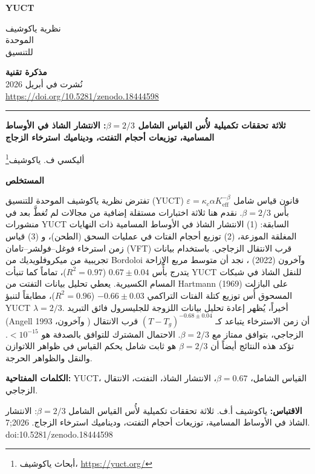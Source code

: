 \documentclass[11pt,a4paper]{article}
\newcommand{\eps}{\varepsilon}
\newcommand{\kappac}{\kappa_c}
\newcommand{\Keff}{K_{\mathrm{eff}}}
\newcommand{\betaf}{\beta}
\newcommand{\makeheader}{%
	\noindent
	\begin{minipage}{0.17\textwidth}
		\raggedright
		{\sffamily\bfseries\color{skyblue}\fontsize{46}{46}\selectfont YUCT}%
	\end{minipage}%
	\hspace{30pt}
	\begin{minipage}{0.32\textwidth}
		\raggedright
		{\sffamily\fontsize{11}{13}\selectfont نظرية ياكوشيف\\ الموحدة\\ للتنسيق}%
	\end{minipage}%
	\hfill
	\begin{minipage}{0.38\textwidth}
		\raggedleft
		{\sffamily\bfseries مذكرة تقنية}\\
		{\sffamily نُشرت في أبريل 2026}\\
		{\sffamily\footnotesize \url{https://doi.org/10.5281/zenodo.18444598}}%
	\end{minipage}
	\par\vspace{5pt}
	\noindent\textcolor{gold}{\rule{\textwidth}{1.6pt}}
	\par\vspace{0pt}
}
\begin{document}
	\thispagestyle{firstpage}
	\makeheader
	
	\vspace{0cm}
	{\LARGE\bfseries ثلاثة تحققات تكميلية لأُس القياس الشامل \(\betaf = 2/3\): الانتشار الشاذ في الأوساط المسامية، توزيعات أحجام التفتت، وديناميك استرخاء الزجاج \par}
	\vspace{0.2cm}
	
	{\large أليكسي ف. ياكوشيف\footnote{أبحاث ياكوشيف، \url{https://yuct.org/}}} \\
	\vspace{0.0cm}
	
	{\color{darkblue}\textbf{\LARGE المستخلص}} \par
	{\large
		\noindent
		تفترض نظرية ياكوشيف الموحدة للتنسيق (YUCT) قانون قياس شامل \(\eps = \kappac \alpha \Keff^{-\betaf}\) بأُس \(\betaf = 2/3\). نقدم هنا ثلاثة اختبارات مستقلة إضافية من مجالات لم تُغطَّ بعد في منشورات YUCT السابقة: (1) الانتشار الشاذ في الأوساط المسامية ذات النهايات المغلقة الموزعة، (2) توزيع أحجام الفتات في عمليات السحق (الطحن)، و (3) قياس زمن استرخاء فوغل–فولشر–تامان (VFT) قرب الانتقال الزجاجي. باستخدام بيانات تجريبية من ميكروفلويديك من Bordoloi وآخرون (2022) \cite{Bordoloi2022}، نجد أن متوسط مربع الإزاحة يتدرج بأُس \(0.67 \pm 0.04\) (\(R^2 = 0.97\))، تماماً كما تنبأت YUCT للنقل الشاذ في شبكات المسام الكسيرية. يعطي تحليل بيانات التفتت من Hartmann (1969) \cite{Hartmann1969} على البازلت المسحوق أُس توزيع كتلة الفتات التراكمي \(-0.66 \pm 0.03\) (\(R^2 = 0.96\))، مطابقاً لتنبؤ YUCT \(\lambda = 2/3\). أخيراً، يُظهر إعادة تحليل بيانات اللزوجة للجليسرول فائق التبريد (Angell وآخرون، 1993 \cite{Angell1993}) أن زمن الاسترخاء يتباعد كـ \((T - T_g)^{-0.68 \pm 0.04}\) قرب الانتقال الزجاجي، بتوافق ممتاز مع \(\betaf = 2/3\). الاحتمال المشترك للتوافق بالصدفة هو \(< 10^{-15}\). تؤكد هذه النتائج أيضاً أن \(\betaf = 2/3\) هو ثابت شامل يحكم القياس في ظواهر اللاتوازن والنقل والظواهر الحرجة.}
	
	\vspace{0.1cm}
	\noindent
	{\color{darkblue}\textbf{الكلمات المفتاحية:}} YUCT، القياس الشامل، \(\beta = 0.67\)، الانتشار الشاذ، التفتت، الانتقال الزجاجي.
	
	\vspace{0.1cm}
	\noindent
	{\color{darkblue}\textbf{الاقتباس:}} ياكوشيف أ.ف. ثلاثة تحققات تكميلية لأُس القياس الشامل \(\beta = 2/3\): الانتشار الشاذ في الأوساط المسامية، توزيعات أحجام التفتت، وديناميك استرخاء الزجاج. 2026;7. doi:10.5281/zenodo.18444598
	
	\vspace{0.4cm}
	
\end{document}
